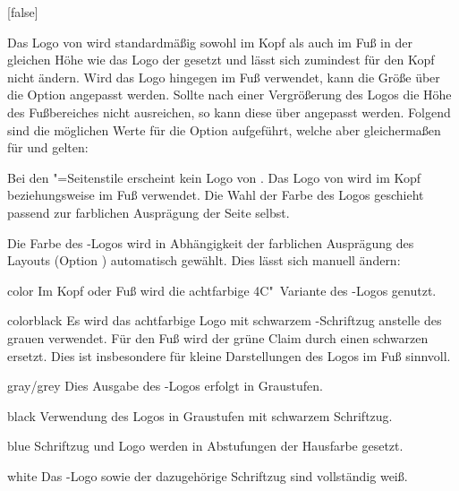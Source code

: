 \begin{Declaration*}{}
\begin{Declaration*}{}
\begin{Declaration*}{}
\begin{Declaration}[%
  v2.02:Logo von \DDC automatisch in Kopf/Fuß;%
  v2.02!\Option{ddc=colorblack};
  v2.02!\Option{ddc=gray};
  v2.02!\Option{ddc=black};
  v2.02!\Option{ddc=blue};
  v2.02!\Option{ddc=white};
]{}[false]
\begin{Declaration}[v2.02]{}
\begin{Declaration}[v2.02]{}
Das Logo von \DDC wird standardmäßig sowohl im Kopf als auch im Fuß in der 
gleichen Höhe wie das Logo der \TnUD gesetzt und lässt sich zumindest für den 
Kopf nicht ändern. Wird das Logo hingegen im Fuß verwendet, kann die Größe über 
die Option  angepasst werden. Sollte nach einer 
Vergrößerung des Logos die Höhe des Fußbereiches nicht ausreichen, so kann 
diese über  angepasst werden. Folgend sind 
die möglichen Werte für die Option  aufgeführt, welche aber 
gleichermaßen für  und  gelten:
%
\begin{values}{}
\itemfalse
  Bei den "=Seitenstile erscheint kein Logo von \DDC.
\itemtrue*
  Das Logo von \DDC wird im Kopf beziehungsweise im Fuß verwendet. Die Wahl der 
  Farbe des Logos geschieht passend zur farblichen Ausprägung der Seite selbst.
\end{values}
%
Die Farbe des \DDC-Logos wird in Abhängigkeit der farblichen Ausprägung des 
Layouts (Option ) automatisch gewählt. Dies lässt sich manuell 
ändern:
%
\begin{values}{}
\item[color]
  Im Kopf oder Fuß wird die achtfarbige 4C"~Variante des \DDC-Logos genutzt.
\item[colorblack]
  Es wird das achtfarbige Logo mit schwarzem \DDC-Schriftzug anstelle des 
  grauen verwendet. Für den Fuß wird der grüne Claim durch einen schwarzen 
  ersetzt. Dies ist insbesondere für kleine Darstellungen des Logos im Fuß 
  sinnvoll.
\item[gray/grey]
  Dies Ausgabe des \DDC-Logos erfolgt in Graustufen.
\item[black]
  Verwendung des Logos in Graustufen mit schwarzem Schriftzug.
\item[blue]
  Schriftzug und Logo werden in Abstufungen der Hausfarbe  gesetzt.
\item[white]
  Das \DDC-Logo sowie der dazugehörige Schriftzug sind vollständig weiß.
\end{values}
%
\end{Declaration}
\end{Declaration}
\end{Declaration}


\end{Declaration*}
\end{Declaration*}
\end{Declaration*}
